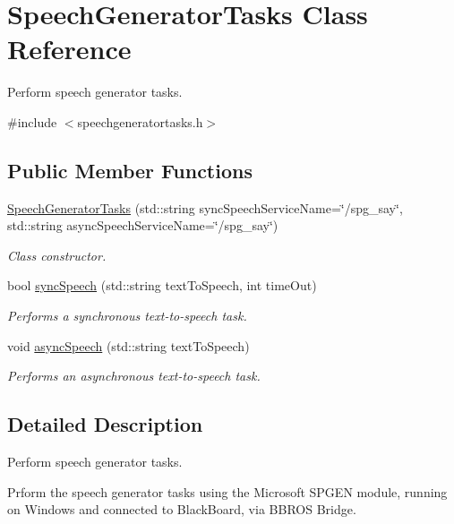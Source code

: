 \hypertarget{class_speech_generator_tasks}{}\section{Speech\+Generator\+Tasks Class Reference}
\label{class_speech_generator_tasks}


Perform speech generator tasks.  




{\ttfamily \#include $<$speechgeneratortasks.\+h$>$}

\subsection*{Public Member Functions}
\begin{DoxyCompactItemize}
\item 
\hyperlink{class_speech_generator_tasks_a616f3b5fd3298a053151e60268035f56}{Speech\+Generator\+Tasks} (std\+::string sync\+Speech\+Service\+Name=\char`\"{}/spg\+\_\+say\char`\"{}, std\+::string async\+Speech\+Service\+Name=\char`\"{}/spg\+\_\+say\char`\"{})
\begin{DoxyCompactList}\small\item\em Class constructor. \end{DoxyCompactList}\item 
bool \hyperlink{class_speech_generator_tasks_a041289135bb48e18a2e6de6ea2aa4add}{sync\+Speech} (std\+::string text\+To\+Speech, int time\+Out)
\begin{DoxyCompactList}\small\item\em Performs a synchronous text-\/to-\/speech task. \end{DoxyCompactList}\item 
void \hyperlink{class_speech_generator_tasks_a8de0e4b4e53876bf5d1c0f7576d981fc}{async\+Speech} (std\+::string text\+To\+Speech)
\begin{DoxyCompactList}\small\item\em Performs an asynchronous text-\/to-\/speech task. \end{DoxyCompactList}\end{DoxyCompactItemize}


\subsection{Detailed Description}
Perform speech generator tasks. 

Prform the speech generator tasks using the Microsoft S\+P\+G\+EN module, running on Windows and connected to Black\+Board, via B\+B\+R\+OS Bridge.

